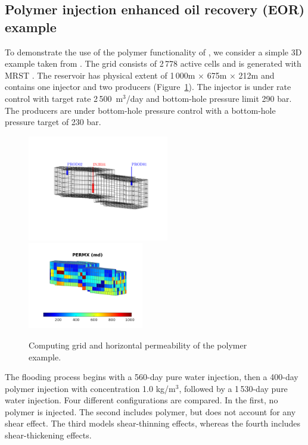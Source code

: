 
\subsection{Polymer injection enhanced oil recovery (EOR) example}
\label{sec:polymer}

To demonstrate the use of the polymer functionality of \opm, we
consider a simple 3D example taken from
\citep{Bao2017}. The grid consists of 2\,778 active cells and is generated with MRST
\citep{MRST}. The reservoir has physical extent of 1\,000m $\times$ 675m $\times$ 212m and
contains one injector and two producers (Figure~\ref{fig:polymer_example_setup}). The
injector is under rate control with target rate 2\,500\ m$^3$/day and bottom-hole pressure
limit 290 bar. The producers are under bottom-hole pressure control with a bottom-hole
pressure target of 230 bar.

\begin{figure}%
{\includegraphics[width=0.55\textwidth]{figures/polymer/grid}} \
{\includegraphics[width=0.45\textwidth]{figures/polymer/permx}}
\caption{Computing grid and horizontal permeability of the polymer example.}
\label{fig:polymer_example_setup}
\end{figure}

The flooding process begins with a 560-day pure water injection, then a 400-day polymer
injection with concentration 1.0 kg/m$^3$, followed by a 1\,530-day pure water
injection. {\revised Four different configurations are compared}.  In the first, no polymer is
injected. The second includes polymer, but does not account for any shear effect. The
third models shear-thinning effects, whereas the fourth includes shear-thickening effects.

